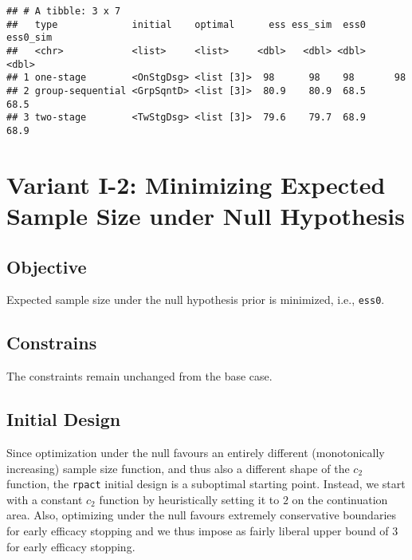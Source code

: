 \documentclass[]{book}
\begin{document}
\begin{verbatim}
## # A tibble: 3 x 7
##   type             initial    optimal      ess ess_sim  ess0 ess0_sim
##   <chr>            <list>     <list>     <dbl>   <dbl> <dbl>    <dbl>
## 1 one-stage        <OnStgDsg> <list [3]>  98      98    98       98  
## 2 group-sequential <GrpSqntD> <list [3]>  80.9    80.9  68.5     68.5
## 3 two-stage        <TwStgDsg> <list [3]>  79.6    79.7  68.9     68.9
\end{verbatim}

\hypertarget{variantI_2}{%
\section{Variant I-2: Minimizing Expected Sample Size under Null Hypothesis}\label{variantI_2}}

\hypertarget{objective-1}{%
\subsection{Objective}\label{objective-1}}

Expected sample size under the null hypothesis prior is minimized,
i.e., \texttt{ess0}.

\hypertarget{constrains-1}{%
\subsection{Constrains}\label{constrains-1}}

The constraints remain unchanged from the base case.

\hypertarget{initial-design}{%
\subsection{Initial Design}\label{initial-design}}

Since optimization under the null favours an entirely different
(monotonically increasing) sample size function,
and thus also a different shape of the \(c_2\) function,
the \texttt{rpact} initial design is a suboptimal starting point.
Instead, we start with a constant \(c_2\) function by heuristically
setting it to \(2\) on the continuation area.
Also, optimizing under the null favours extremely conservative
boundaries for early efficacy stopping and we thus impose as fairly
liberal upper bound of \(3\) for early efficacy stopping.
\end{document}
